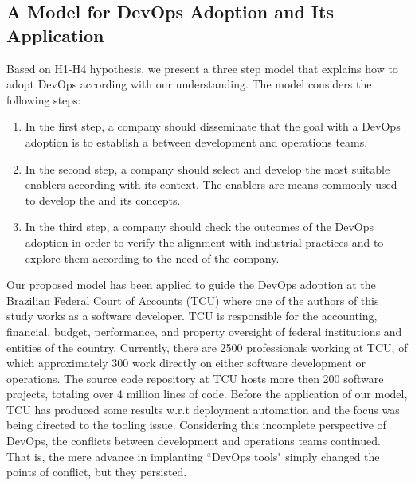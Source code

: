 \subsection{A Model for DevOps Adoption and Its Application}\label{sec:case_study}

Based on H1-H4 hypothesis, we present a three step model that
explains how to adopt DevOps according with our understanding. The
model considers the following steps:

\begin{enumerate}
\item In the first step, a company should
disseminate that the goal with a DevOps adoption is to
establish a \cc between
development and operations teams.

\item In the second step, a company should select and develop
the most suitable enablers according with its context. The enablers
are means commonly used to develop the \cc
and its concepts.

\item In the third step, a company should check the outcomes of the
DevOps adoption in order to verify the alignment with
industrial practices and to explore them according to the
need of the company.
\end{enumerate}

Our proposed model has been applied to guide the DevOps adoption at the Brazilian Federal Court of
Accounts (TCU) where one of the authors of this study works as a software
developer. TCU is responsible for the accounting, financial, budget, performance, and property
oversight of federal institutions and entities of the country. Currently, there are 2500
professionals working at TCU, of which approximately 300 work directly on either
software development or operations. The source code repository at TCU hosts more then 200 software projects, totaling
over 4 million lines of code.
Before the application of our model, TCU has produced some results w.r.t deployment
automation and the focus was being directed to the tooling issue. Considering this
incomplete perspective of DevOps, the conflicts between development and operations
teams continued. That is, the mere advance in implanting ``DevOps tools" simply
changed the points of conflict, but they persisted.

